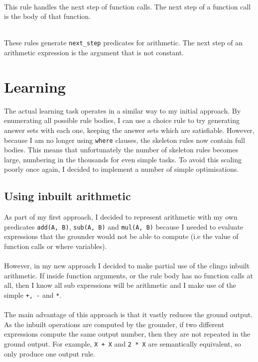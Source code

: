  
\mbox{} \\
This rule handles the next step of function calls. The next step of a function call is the body of that function.

 
\mbox{} \\
These rules generate \lstinline{next_step} predicates for arithmetic. The next step of an arithmetic expression is the argument that is not constant. %

\section{Learning}
The actual learning task operates in a similar way to my initial approach. By enumerating all possible rule bodies, I can use a choice rule to try generating answer sets with each one, keeping the answer sets which are satisfiable. However, because I am no longer using \lstinline{where} clauses, the skeleton rules now contain full bodies. This means that unfortunately the number of skeleton rules becomes large, numbering in the thousands for even simple tasks. To avoid this scaling poorly once again, I decided to implement a number of simple optimisations.%

\subsection{Using inbuilt arithmetic}
As part of my first approach, I decided to represent arithmetic with my own predicates \lstinline{add(A, B)}, \lstinline{sub(A, B)} and \lstinline{mul(A, B)} because I needed to evaluate expressions that the grounder would not be able to compute (i.e the value of function calls or where variables). \\ \\ %
However, in my new approach I decided to make partial use of the clingo inbuilt arithmetic. If inside function arguments, or the rule body has no function calls at all, then I know all sub expressions will be arithmetic and I make use of the simple \lstinline{+, -} and \lstinline{*}. \\ \\
The main advantage of this approach is that it vastly reduces the ground output. As the inbuilt operations are computed by the grounder, if two different expressions compute the same output number, then they are not repeated in the ground output. For example, \lstinline{X + X} and \lstinline{2 * X} are semantically equivalent, so only produce one output rule.

